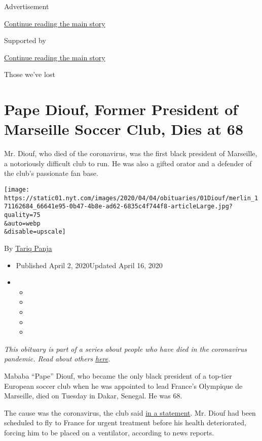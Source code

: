 Advertisement

\protect\hyperlink{after-top}{Continue reading the main story}

Supported by

\protect\hyperlink{after-sponsor}{Continue reading the main story}

Those we've lost

\hypertarget{pape-diouf-former-president-of-marseille-soccer-club-dies-at-68}{%
\section{Pape Diouf, Former President of Marseille Soccer Club, Dies at
68}\label{pape-diouf-former-president-of-marseille-soccer-club-dies-at-68}}

Mr. Diouf, who died of the coronavirus, was the first black president of
Marseille, a notoriously difficult club to run. He was also a gifted
orator and a defender of the club's passionate fan base.

\texttt{[image: https://static01.nyt.com/images/2020/04/04/obituaries/01Diouf/merlin\_171162684\_66641e95-0b47-4b8e-ad62-6835c4f744f8-articleLarge.jpg?quality=75\\\&auto=webp\\\&disable=upscale]}

By \href{https://www.nytimes.com/by/tariq-panja}{Tariq Panja}

\begin{itemize}
\item
  Published April 2, 2020Updated April 16, 2020
\item
  \begin{itemize}
  \item
  \item
  \item
  \item
  \item
  \end{itemize}
\end{itemize}

\emph{This obituary is part of a series about people who have died in
the coronavirus pandemic. Read about others}
\href{https://www.nytimes.com/series/people-who-have-died-of-the-coronavirus}{\emph{here}}\emph{.}

Mababa ``Pape'' Diouf, who became the only black president of a top-tier
European soccer club when he was appointed to lead France's Olympique de
Marseille, died on Tuesday in Dakar, Senegal. He was 68.

The cause was the coronavirus, the club said
\href{https://www.om.fr/fr/actualites/4808/le-club/34241-pape-diouf-sest-eteint}{in
a statement}. Mr. Diouf had been scheduled to fly to France for urgent
treatment before his health deteriorated, forcing him to be placed on a
ventilator, according to news reports.

